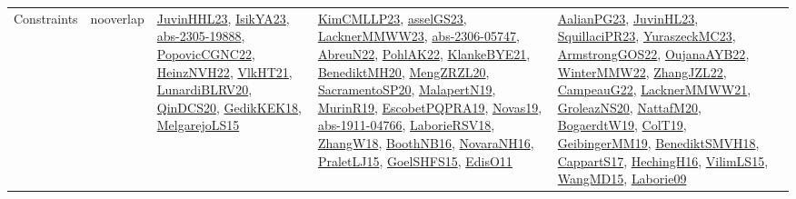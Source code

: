 {\begin{longtable}{llp{6cm}p{6cm}p{6cm}}
Constraints & nooverlap & \href{papers/JuvinHHL23.pdf}{JuvinHHL23}\cite{JuvinHHL23}, \href{articles/IsikYA23.pdf}{IsikYA23}\cite{IsikYA23}, \href{articles/abs-2305-19888.pdf}{abs-2305-19888}\cite{abs-2305-19888}, \href{papers/PopovicCGNC22.pdf}{PopovicCGNC22}\cite{PopovicCGNC22}, \href{articles/HeinzNVH22.pdf}{HeinzNVH22}\cite{HeinzNVH22}, \href{articles/VlkHT21.pdf}{VlkHT21}\cite{VlkHT21}, \href{articles/LunardiBLRV20.pdf}{LunardiBLRV20}\cite{LunardiBLRV20}, \href{articles/QinDCS20.pdf}{QinDCS20}\cite{QinDCS20}, \href{articles/GedikKEK18.pdf}{GedikKEK18}\cite{GedikKEK18}, \href{papers/MelgarejoLS15.pdf}{MelgarejoLS15}\cite{MelgarejoLS15} & \href{papers/KimCMLLP23.pdf}{KimCMLLP23}\cite{KimCMLLP23}, \href{papers/asselGS23.pdf}{asselGS23}\cite{asselGS23}, \href{articles/LacknerMMWW23.pdf}{LacknerMMWW23}\cite{LacknerMMWW23}, \href{articles/abs-2306-05747.pdf}{abs-2306-05747}\cite{abs-2306-05747}, \href{articles/AbreuN22.pdf}{AbreuN22}\cite{AbreuN22}, \href{articles/PohlAK22.pdf}{PohlAK22}\cite{PohlAK22}, \href{papers/KlankeBYE21.pdf}{KlankeBYE21}\cite{KlankeBYE21}, \href{articles/BenediktMH20.pdf}{BenediktMH20}\cite{BenediktMH20}, \href{articles/MengZRZL20.pdf}{MengZRZL20}\cite{MengZRZL20}, \href{articles/SacramentoSP20.pdf}{SacramentoSP20}\cite{SacramentoSP20}, \href{papers/MalapertN19.pdf}{MalapertN19}\cite{MalapertN19}, \href{papers/MurinR19.pdf}{MurinR19}\cite{MurinR19}, \href{articles/EscobetPQPRA19.pdf}{EscobetPQPRA19}\cite{EscobetPQPRA19}, \href{articles/Novas19.pdf}{Novas19}\cite{Novas19}, \href{articles/abs-1911-04766.pdf}{abs-1911-04766}\cite{abs-1911-04766}, \href{articles/LaborieRSV18.pdf}{LaborieRSV18}\cite{LaborieRSV18}, \href{articles/ZhangW18.pdf}{ZhangW18}\cite{ZhangW18}, \href{papers/BoothNB16.pdf}{BoothNB16}\cite{BoothNB16}, \href{articles/NovaraNH16.pdf}{NovaraNH16}\cite{NovaraNH16}, \href{papers/PraletLJ15.pdf}{PraletLJ15}\cite{PraletLJ15}, \href{articles/GoelSHFS15.pdf}{GoelSHFS15}\cite{GoelSHFS15}, \href{papers/EdisO11.pdf}{EdisO11}\cite{EdisO11} & \href{papers/AalianPG23.pdf}{AalianPG23}\cite{AalianPG23}, \href{papers/JuvinHL23.pdf}{JuvinHL23}\cite{JuvinHL23}, \href{papers/SquillaciPR23.pdf}{SquillaciPR23}\cite{SquillaciPR23}, \href{papers/YuraszeckMC23.pdf}{YuraszeckMC23}\cite{YuraszeckMC23}, \href{papers/ArmstrongGOS22.pdf}{ArmstrongGOS22}\cite{ArmstrongGOS22}, \href{papers/OujanaAYB22.pdf}{OujanaAYB22}\cite{OujanaAYB22}, \href{papers/WinterMMW22.pdf}{WinterMMW22}\cite{WinterMMW22}, \href{papers/ZhangJZL22.pdf}{ZhangJZL22}\cite{ZhangJZL22}, \href{articles/CampeauG22.pdf}{CampeauG22}\cite{CampeauG22}, \href{papers/LacknerMMWW21.pdf}{LacknerMMWW21}\cite{LacknerMMWW21}, \href{papers/GroleazNS20.pdf}{GroleazNS20}\cite{GroleazNS20}, \href{papers/NattafM20.pdf}{NattafM20}\cite{NattafM20}, \href{papers/BogaerdtW19.pdf}{BogaerdtW19}\cite{BogaerdtW19}, \href{papers/ColT19.pdf}{ColT19}\cite{ColT19}, \href{papers/GeibingerMM19.pdf}{GeibingerMM19}\cite{GeibingerMM19}, \href{papers/BenediktSMVH18.pdf}{BenediktSMVH18}\cite{BenediktSMVH18}, \href{papers/CappartS17.pdf}{CappartS17}\cite{CappartS17}, \href{papers/HechingH16.pdf}{HechingH16}\cite{HechingH16}, \href{papers/VilimLS15.pdf}{VilimLS15}\cite{VilimLS15}, \href{articles/WangMD15.pdf}{WangMD15}\cite{WangMD15}, \href{papers/Laborie09.pdf}{Laborie09}\cite{Laborie09}\\

\end{longtable}}
